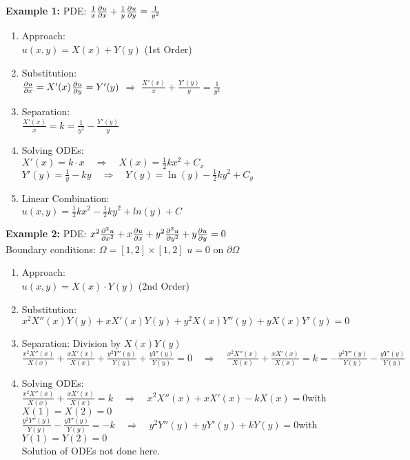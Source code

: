 \begin{minipage}[t]{0.49\textwidth}
\textbf{Example 1: } PDE: $\frac1x\frac{\partial u}{\partial x}+\frac1y\frac{\partial u}{\partial y}=\frac{1}{y^2}$
\begin{enumerate}
	\item Approach:\\[0.4cm]
	$u(x,y)=X(x) + Y(y)$ (1st Order)
	\item Substitution:\\[0.4cm]
	$\frac{\partial u}{\partial x}=X'(x)$\qquad $\frac{\partial u}{\partial y}=Y'(y)$ \quad $\Rightarrow$ \quad $\frac{X'(x)}{x}+\frac{Y'(y)}{y}=\frac{1}{y^2}$
	\item Separation:\\[0.4cm]
	$\frac{X'(x)}{x}=k=\frac{1}{y^2}-\frac{Y'(y)}{y}$
	\item Solving ODEs:\\[0.4cm]
	$X'(x)=k\cdot x \quad\Rightarrow\quad X(x)=\frac12 kx^2+C_x$\\
	$Y'(y)=\frac1y-ky \quad\Rightarrow\quad Y(y)=\ln(y)-\frac12 ky^2+C_y$
	\item Linear Combination:\\[0.4cm]
	$u(x,y)=\frac12 kx^2 - \frac12 ky^2+ln(y)+C$
\end{enumerate}

\textbf{Example 2: } PDE: $x^2\frac{\partial ^2u}{\partial x^2}+x\frac{\partial u}{\partial x}+y^2\frac{\partial ^2u}{\partial y^2}+y\frac{\partial u}{\partial y}=0$\\
Boundary conditions: $\Omega=[1,2]\times[1,2]$ \qquad $u=0$ on $\partial\Omega$
\begin{enumerate}
	\item Approach:\\[0.4cm]
	$u(x,y)=X(x) \cdot Y(y)$ (2nd Order)
	\item Substitution:\\[0.4cm]
	$x^2X''(x)Y(y)+xX'(x)Y(y)+y^2X(x)Y''(y)+yX(x)Y'(y)=0$
	\item Separation: Division by $X(x)Y(y)$\\[0.4cm]
	$\frac{x^2X''(x)}{X(x)}+\frac{xX'(x)}{X(x)}+\frac{y^2Y''(y)}{Y(y)}+\frac{yY'(y)}{Y(y)}=0\quad\Rightarrow\quad \frac{x^2X''(x)}{X(x)}+\frac{xX'(x)}{X(x)}=k=-\frac{y^2Y''(y)}{Y(y)}-\frac{yY'(y)}{Y(y)}$
	\item Solving ODEs:\\[0.4cm]
	$\frac{x^2X''(x)}{X(x)}+\frac{xX'(x)}{X(x)}=k\quad\Rightarrow\quad x^2X''(x)+xX'(x)-kX(x)=0$\qquad with $X(1)=X(2)=0$\\
	$\frac{y^2Y''(y)}{Y(y)}-\frac{yY'(y)}{Y(y)}=-k\quad\Rightarrow\quad y^2Y''(y)+yY'(y)+kY(y)=0$\qquad with $Y(1)=Y(2)=0$\\[0.4cm]
	Solution of ODEs not done here.
\end{enumerate}
\end{minipage}
